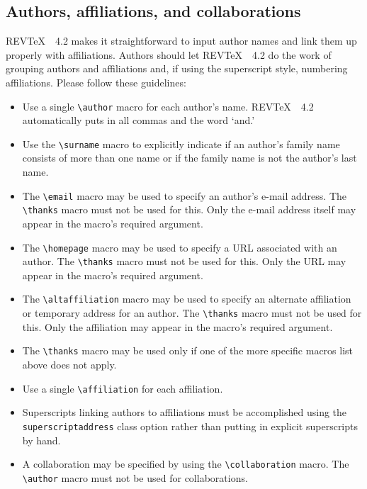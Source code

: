 \documentclass[twocolumn,secnumarabic,amssymb, nobibnotes, aps, prd]{revtex4-2}
\newcommand{\revtex}{REV\TeX\ }
\newcommand{\classoption}[1]{\texttt{#1}}
\newcommand{\macro}[1]{\texttt{\textbackslash#1}}
\newcommand{\m}[1]{\macro{#1}}
\begin{document}
\subsection{Authors, affiliations, and collaborations}
\label{sec:authors}
\revtex\ 4.2 makes it straightforward to input author names and link them up properly with affiliations. Authors should let \revtex\ 4.2 do the work of grouping authors and affiliations and, if using the superscript style, numbering affiliations. Please follow these guidelines:
\begin{itemize}
\item Use a single \m{author} macro for each author's name. \revtex\ 4.2 automatically puts in all commas and the word `and.'
\item Use the \m{surname} macro to explicitly indicate if an author's family name consists of more than one name or if the family name is not the author's last name.
\item The \m{email} macro may be used to specify an author's e-mail
address. The \m{thanks} macro must not be used for this. Only the
e-mail address itself may appear in the macro's required argument.
\item The \m{homepage} macro may be used to specify a URL associated
with an author. The \m{thanks} macro must not be used for this. Only the
URL may appear in the macro's required argument.
\item The \m{altaffiliation} macro may be used to specify an alternate
affiliation or temporary address for an author. The \m{thanks} macro
must not be used for this. Only the affiliation
may appear in the macro's required argument.
\item The \m{thanks} macro may be used only if one of the more
specific macros list above does not apply.
\item Use a single \m{affiliation} for each affiliation.
\item Superscripts linking authors to affiliations must be
accomplished using the \classoption{superscriptaddress} class option
rather than putting in explicit superscripts by hand.
\item A collaboration may be specified by using the \m{collaboration}
macro. The \m{author} macro must not be used for collaborations.
\end{itemize}
\end{document}
